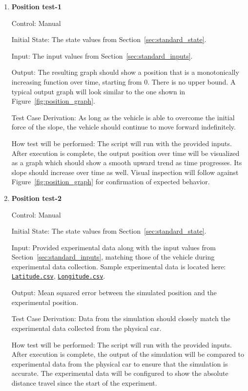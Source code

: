 \documentclass[12pt, titlepage]{article}
\newcommand{\refdata}[2]{
  \href{https://github.com/gr812b/CVT-Simulator/blob/main/experimental-data/#1
  }{\texttt{#2}}}
\begin{document}
\begin{enumerate}
  
  \item {} \hypertarget{PositionTest-1}{\textbf{Position test-1}} \label{PositionTest-1}
  
  Control: Manual
            
  Initial State: The state values from Section~\ref{sec:standard_state}.
  
  Input: The input values from Section~\ref{sec:standard_inputs}.
            
  Output: The resulting graph should show a position that is a monotonically increasing function over time, starting from 0. There is no upper bound. A typical output graph will look similar to the one shown in Figure~\ref{fig:position_graph}.
  
  Test Case Derivation: As long as the vehicle is able to overcome the initial force of the slope, the vehicle should continue to move forward indefinitely.
  
  How test will be performed: The script will run with the provided inputs. After execution is complete, the output position over time will be visualized as a graph which should show a smooth upward trend as time progresses. Its slope should increase over time as well. Visual inspection will follow against Figure~\ref{fig:position_graph} for confirmation of expected behavior.
  
  \item {} \hypertarget{PositionTest-2}{\textbf{Position test-2}} \label{PositionTest-2}

  Control: Manual

  Initial State: The state values from Section~\ref{sec:standard_state}.
  
  Input: Provided experimental data along with the input values from Section~\ref{sec:standard_inputs}, matching those of the vehicle during experimental data collection. Sample experimental data is located here: \refdata{GPS\%20LATITUDE.csv}{Latitude.csv}, \refdata{GPS\%20LONGITUDE.csv}{Longitude.csv}.

  Output: Mean squared error between the simulated position and the experimental position.

  Test Case Derivation: Data from the simulation should closely match the experimental data collected from the physical car.

  How test will be performed: The script will run with the provided inputs. After execution is complete, the output of the simulation will be compared to experimental data from the physical car to ensure that the simulation is accurate. The experimental data will be configured to show the absolute distance travel since the start of the experiment.

\end{enumerate}
		
\end{document}
